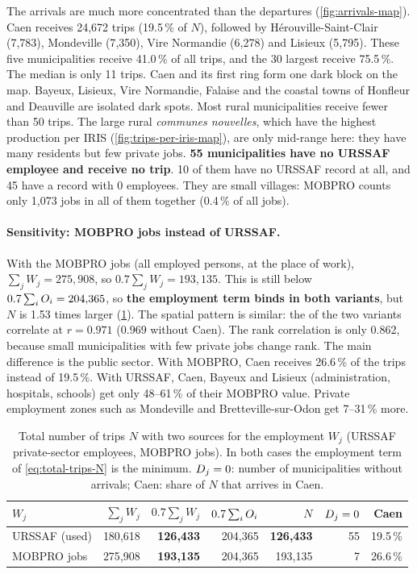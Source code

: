 The arrivals are much more concentrated than the departures (\cref{fig:arrivals-map}). Caen receives 24{,}672 trips
(19.5\,\% of $N$), followed by H\'erouville-Saint-Clair (7{,}783), Mondeville (7{,}350), Vire Normandie (6{,}278) and
Lisieux (5{,}795). These five municipalities receive 41.0\,\% of all trips, and the 30 largest receive 75.5\,\%. The
median is only 11 trips. Caen and its first ring form one dark block on the map. Bayeux, Lisieux, Vire Normandie,
Falaise and the coastal towns of Honfleur and Deauville are isolated dark spots. Most rural municipalities receive fewer
than 50 trips. The large rural \emph{communes nouvelles}, which have the highest production per IRIS
(\cref{fig:trips-per-iris-map}), are only mid-range here: they have many residents but few private jobs.
\textbf{55 municipalities have no URSSAF employee and receive no trip}. 10 of them have no URSSAF record at all, and 45
have a record with 0 employees. They are small villages: MOBPRO counts only 1{,}073 jobs in all of them together
(0.4\,\% of all jobs).

\paragraph{Sensitivity: MOBPRO jobs instead of URSSAF.}
With the MOBPRO jobs (all employed persons, at the place of work), $\sum_j W_j = 275{,}908$, so
$0.7 \sum_j W_j = 193{,}135$. This is still below $0.7 \sum_i O_i = 204{,}365$, so \textbf{the employment term binds in
both variants}, but $N$ is 1.53 times larger (\cref{tab:attraction-sensitivity}). The spatial pattern is similar: the
\Dj{} of the two variants correlate at $r = 0.971$ ($0.969$ without Caen). The rank correlation is only 0.862, because
small municipalities with few private jobs change rank. The main difference is the public sector. With MOBPRO, Caen
receives 26.6\,\% of the trips instead of 19.5\,\%. With URSSAF, Caen, Bayeux and Lisieux (administration, hospitals,
schools) get only 48--61\,\% of their MOBPRO value. Private employment zones such as Mondeville and Bretteville-sur-Odon
get 7--31\,\% more.

\begin{table}[H]
  \centering
  \caption{Total number of trips $N$ with two sources for the employment $W_j$ (URSSAF private-sector employees,
  MOBPRO jobs). In both cases the employment term of \cref{eq:total-trips-N} is the minimum. $D_j = 0$: number of
  municipalities without arrivals; Caen: share of $N$ that arrives in Caen.}
  \label{tab:attraction-sensitivity}
  \begin{tabular}{@{}lrrrrrr@{}}
    \toprule
    $W_j$ & $\sum_j W_j$ & $0.7 \sum_j W_j$ & $0.7 \sum_i O_i$ & $N$ & $D_j = 0$ & Caen \\
    \midrule
    URSSAF (used) & 180{,}618 & \textbf{126{,}433} & 204{,}365 & \textbf{126{,}433} & 55 & 19.5\,\% \\
    MOBPRO jobs & 275{,}908 & \textbf{193{,}135} & 204{,}365 & 193{,}135 & 7 & 26.6\,\% \\
    \bottomrule
  \end{tabular}
\end{table}

